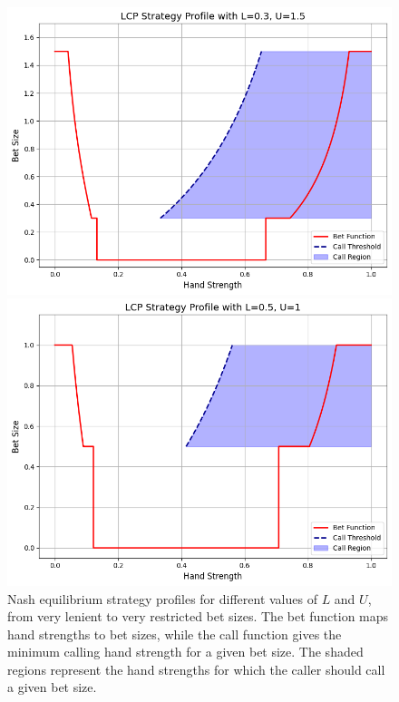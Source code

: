\documentclass[../../main/main.tex]{subfiles}
\begin{document}
\begin{figure}[h!]
\begin{adjustwidth}{-1in}{-1in}
        \begin{minipage}{0.6\textwidth}
            \centering
            \includegraphics[width=\textwidth]{images/LCP_profile_0.3_1.5.png}
        \end{minipage}
        \hspace{0.05\textwidth}
        \begin{minipage}{0.6\textwidth}
            \centering
            \includegraphics[width=\textwidth]{images/LCP_profile_0.5_1.png}
        \end{minipage}
    \end{adjustwidth}
    \caption{Nash equilibrium strategy profiles for different values of $L$ and $U$, from very lenient to very restricted bet sizes. The bet function maps hand strengths to bet sizes, while the call function gives the minimum calling hand strength for a given bet size. The shaded regions represent the hand strengths for which the caller should call a given bet size.}
    \label{fig:strategyprofile}
\end{figure}
\end{document}
